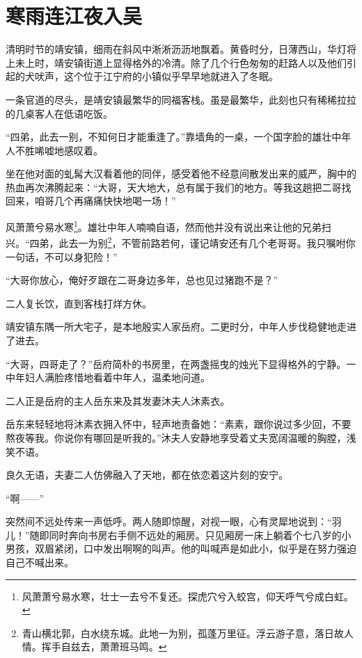 \chapter{寒雨连江夜入吴}
\label{chap:han-yu-lian-jiang-ye-ru-wu}


清明时节的靖安镇，细雨在斜风中淅淅沥沥地飘着。黄昏时分，日薄西山，华灯将上未上时，靖安镇街道上显得格外的冷清。除了几个行色匆匆的赶路人以及他们引起的犬吠声，这个位于江宁府的小镇似乎早早地就进入了冬眠。

一条官道的尽头，是靖安镇最繁华的同福客栈。虽是最繁华，此刻也只有稀稀拉拉的几桌客人在低语吃饭。

“四弟，此去一别，不知何日才能重逢了。”靠墙角的一桌，一个国字脸的雄壮中年人不胜唏嘘地感叹着。

坐在他对面的虬髯大汉看着他的同伴，感受着他不经意间散发出来的威严，胸中的热血再次沸腾起来：“大哥，天大地大，总有属于我们的地方。等我这趟把二哥找回来，咱哥几个再痛痛快快地喝一场！”

风萧萧兮易水寒\footnote{风萧萧兮易水寒，壮士一去兮不复还。探虎穴兮入蛟宫，仰天呼气兮成白虹。}。雄壮中年人喃喃自语，然而他并没有说出来让他的兄弟扫兴。“四弟，此去一为别\footnote{青山横北郭，白水绕东城。此地一为别，孤蓬万里征。浮云游子意，落日故人情。挥手自兹去，萧萧班马鸣。}，不管前路若何，谨记靖安还有几个老哥哥。我只嘱咐你一句话，不可以身犯险！”

“大哥你放心，俺好歹跟在二哥身边多年，总也见过猪跑不是？”

二人复长饮，直到客栈打烊方休。

\splitline

靖安镇东隅一所大宅子，是本地殷实人家岳府。二更时分，中年人步伐稳健地走进了进去。

“大哥，四哥走了？”岳府简朴的书房里，在两盏摇曳的烛光下显得格外的宁静。一中年妇人满脸疼惜地看着中年人，温柔地问道。

二人正是岳府的主人岳东来及其发妻沐夫人沐素衣。

岳东来轻轻地将沐素衣拥入怀中，轻声地责备她：“素素，跟你说过多少回，不要熬夜等我。你说你有哪回是听我的。”沐夫人安静地享受着丈夫宽阔温暖的胸膛，浅笑不语。

良久无语，夫妻二人仿佛融入了天地，都在依恋着这片刻的安宁。

“啊------”

突然间不远处传来一声低呼。两人随即惊醒，对视一眼，心有灵犀地说到：“羽儿！”随即同时奔向书房右手侧不远处的厢房。只见厢房一床上躺着个七八岁的小男孩，双眉紧闭，口中发出啊啊的叫声。他的叫喊声是如此小，似乎是在努力强迫自己不喊出来。

